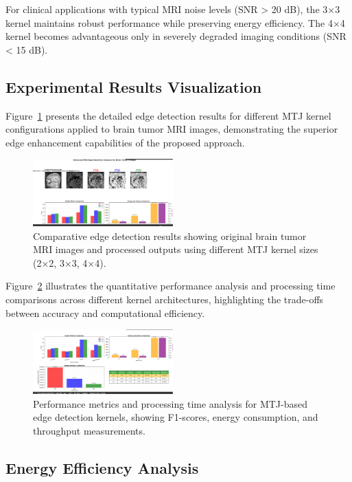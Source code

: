 \documentclass[conference]{IEEEtran}
\begin{document}
For clinical applications with typical MRI noise levels (SNR > 20 dB), the 3×3 kernel maintains robust performance while preserving energy efficiency. The 4×4 kernel becomes advantageous only in severely degraded imaging conditions (SNR < 15 dB).

\subsection{Experimental Results Visualization}

Figure~\ref{fig:results1} presents the detailed edge detection results for different MTJ kernel configurations applied to brain tumor MRI images, demonstrating the superior edge enhancement capabilities of the proposed approach.

\begin{figure}[htbp]
\centerline{\includegraphics[width=0.48\textwidth]{Screenshot 2025-07-12 123903.png}}
\caption{Comparative edge detection results showing original brain tumor MRI images and processed outputs using different MTJ kernel sizes (2×2, 3×3, 4×4).}
\label{fig:results1}
\end{figure}

Figure~\ref{fig:results2} illustrates the quantitative performance analysis and processing time comparisons across different kernel architectures, highlighting the trade-offs between accuracy and computational efficiency.

\begin{figure}[htbp]
\centerline{\includegraphics[width=0.48\textwidth]{Screenshot 2025-07-12 123917.png}}
\caption{Performance metrics and processing time analysis for MTJ-based edge detection kernels, showing F1-scores, energy consumption, and throughput measurements.}
\label{fig:results2}
\end{figure}

\subsection{Energy Efficiency Analysis}
\end{document}
